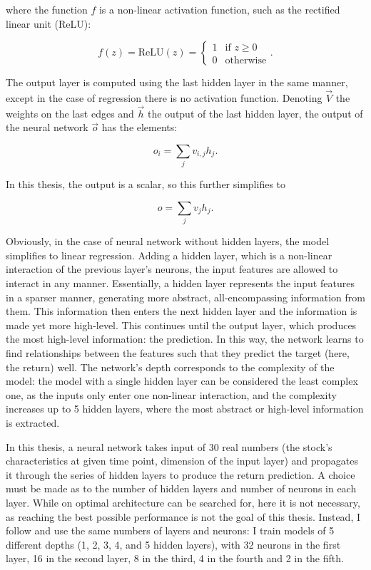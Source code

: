 	where the function $f$ is a non-linear activation function, such as the rectified linear unit (ReLU):
	
	\[
		f(z) = \text{ReLU}(z) =   
			\begin{cases}
				1 & \text{if } z \geq 0\\
				0 & \text{otherwise}
			\end{cases}.
	\]
	
	The output layer is computed using the last hidden layer in the same manner, except in the case of regression there is no activation function. Denoting $\vec{V}$ the weights on the last edges and $\vec{h}$ the output of the last hidden layer, the output of the neural network $\vec{o}$ has the elements: 
	
	\begin{equation}
		o_i = \sum_{j}v_{i,j} h_j.
	\end{equation}
	
	In this thesis, the output is a scalar, so this further simplifies to 
	
	\begin{equation}
		o = \sum_{j}v_{j} h_j.
	\end{equation}
	
	Obviously, in the case of neural network without hidden layers, the model simplifies to linear regression. Adding a hidden layer, which is a non-linear interaction of the previous layer's neurons, the input features are allowed to interact in any manner. Essentially, a hidden layer represents the input features in a sparser manner, generating more abstract, all-encompassing information from them. This information then enters the next hidden layer and the information is made yet more high-level. This continues until the output layer, which produces the most high-level information: the prediction. In this way, the network learns to find relationships between the features such that they predict the target (here, the return) well. The network's depth corresponds to the complexity of the model: the model with a single hidden layer can be considered the least complex one, as the inputs only enter one non-linear interaction, and the complexity increases up to 5 hidden layers, where the most abstract or high-level information is extracted. 
	
	In this thesis, a neural network takes input of 30 real numbers (the stock's characteristics at given time point, dimension of the input layer) and propagates it through the series of hidden layers to produce the return prediction.	A choice must be made as to the number of hidden layers and number of neurons in each layer. While on optimal architecture can be searched for, here it is not necessary, as reaching the best possible performance is not the goal of this thesis. Instead, I follow \cite{gu2020empirical} and use the same numbers of layers and neurons: I train models of 5 different depths (1, 2, 3, 4, and 5 hidden layers), with 32 neurons in the first layer, 16 in the second layer, 8 in the third, 4 in the fourth and 2 in the fifth.  
	
